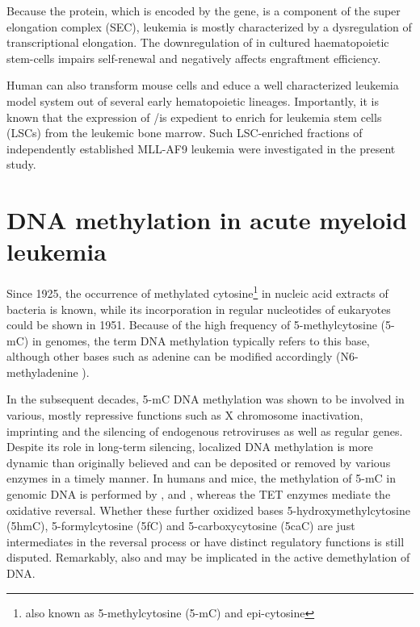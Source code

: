 Because the  protein, which is encoded by the  gene, is a component of the super elongation complex (SEC)\cite{He2010,Lin2010}, \mllafnine leukemia is mostly characterized by a dysregulation of transcriptional elongation. The downregulation of  in cultured  haematopoietic stem-cells impairs self-renewal and negatively affects engraftment efficiency\cite{Calvanese2019}.
 
Human  can also transform mouse cells and educe a well characterized leukemia model system\cite{Somervaille2009,Krivtsov2013,Stavropoulou2016} out of several early hematopoietic lineages\cite{George2016}. Importantly, it is known that the expression of /\kit is expedient to enrich for leukemia stem cells (LSCs)\cite{Dick2005} from the leukemic bone marrow\cite{Krivtsov2006,Somervaille2006}. Such LSC-enriched \kitpos fractions of independently established MLL-AF9 leukemia were investigated in the present study. 

\section{DNA methylation in acute myeloid leukemia}
\label{chap:i:abridged:amlmethylation}

Since 1925, the occurrence of methylated cytosine\footnote{also known as 5-methylcytosine (5-mC) and epi-cytosine} in nucleic acid extracts of bacteria is known\cite{Johnson1925}, while its incorporation in regular nucleotides of eukaryotes could be shown in 1951\cite{Cohn1951}. Because of the high frequency of 5-methylcytosine (5-mC) in genomes, the term DNA methylation typically refers to this base, although other bases such as adenine can be modified accordingly (N6-methyladenine )\cite{Dominissini2012}.    

In the subsequent decades, 5-mC DNA methylation was shown to be involved in various, mostly repressive functions such as X chromosome inactivation, imprinting and the silencing of endogenous retroviruses as well as regular genes. Despite its role in long-term silencing, localized DNA methylation is more dynamic than originally believed and can be deposited or removed by various enzymes in a timely manner. In humans and mice, the methylation of 5-mC in genomic DNA is performed by ,  and , whereas the TET enzymes mediate the oxidative reversal. Whether these further oxidized bases 5-hydroxymethylcytosine (5hmC), 5-formylcytosine (5fC) and 5-carboxycytosine (5caC) are just intermediates in the reversal process or have distinct regulatory functions is still disputed. Remarkably, also  and  may be implicated in the active demethylation of DNA.   

